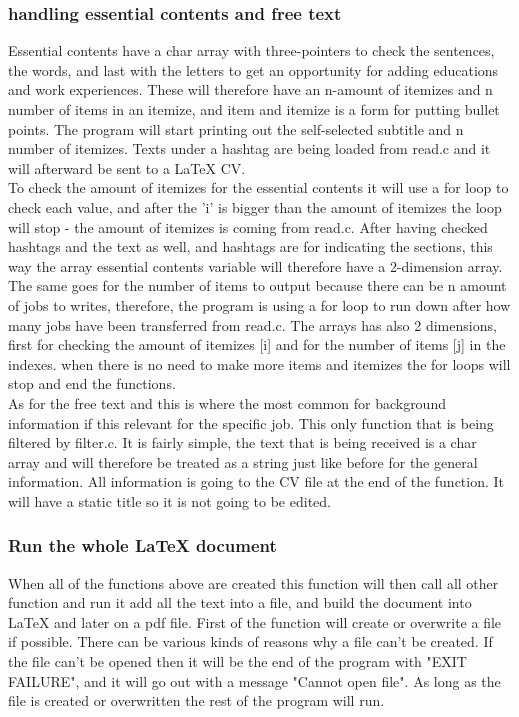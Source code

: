 \subsubsection{handling essential contents and free text}
Essential contents have a char array with three-pointers to check the sentences,
the words, and last with the letters to get an opportunity for adding educations and work experiences.
These will therefore have an n-amount of itemizes and n number of items in an itemize, 
and item and itemize is a form for putting bullet points.
The program will start printing out the self-selected subtitle and n number of itemizes.
Texts under a hashtag are being loaded from read.c and it will afterward be sent to a LaTeX CV.\\
 
To check the amount of itemizes for the essential contents it will use a for loop to check each value,
and after the 'i' is bigger than the amount of itemizes the loop will stop - the amount of itemizes is coming from read.c.
After having checked hashtags and the text as well, and hashtags are for indicating the sections,
this way the array essential contents variable will therefore have a 2-dimension array.
The same goes for the number of items to output because there can be n amount of jobs to writes, 
therefore, the program is using a for loop to run down after how many jobs have been transferred from read.c.
The arrays has also 2 dimensions, first for checking the amount of itemizes [i] and for the number of items [j] in the indexes.
when there is no need to make more items and itemizes the for loops will stop and end the functions. \\

As for the free text and this is where the most common for background information if this relevant for the specific job.
This only function that is being filtered by filter.c. It is fairly simple, 
the text that is being received is a char array and will therefore be treated as a string 
just like before for the general information. All information is going to the CV file at the end of the function.
It will have a static title so it is not going to be edited.

\subsubsection{Run the whole LaTeX document}
When all of the functions above are created this function will then call all other function and run it add all the text into a file,
and build the document into LaTeX and later on a pdf file.
First of the function will create or overwrite a file if possible. There can be various kinds of reasons why a file can't be created.
If the file can't be opened then it will be the end of the program with "EXIT FAILURE", 
and it will go out with a message "Cannot open file".
As long as the file is created or overwritten the rest of the program will run.\\

